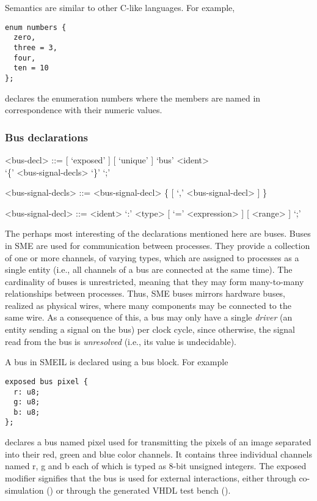 Semantics are similar to other C-like languages. For example,
\begin{lstlisting}[language=smeil]
enum numbers {
  zero,
  three = 3,
  four,
  ten = 10
};
\end{lstlisting}
declares the enumeration {\ttfamily numbers} where the members are named in
correspondence with their numeric values.


\subsubsection{Bus declarations}

\begin{grammar}
<bus-decl> ::= [ `exposed' ] [ `unique' ] `bus' <ident> \\ `\{' <bus-signal-decls> `\}'  `;'

<bus-signal-decls> ::= <bus-signal-decl> \{ [ `,' <bus-signal-decl> ] \}

<bus-signal-decl> ::= <ident> `:' <type> [ `=' <expression> ] [ <range> ] `;'
\end{grammar}

The perhaps most interesting of the declarations mentioned here are buses. Buses
in SME are used for communication between processes. They provide a collection
of one or more channels, of varying types, which are assigned to processes as a
single entity (i.e., all channels of a bus are connected at the same time). The
cardinality of buses is unrestricted, meaning that they may form many-to-many
relationships between processes. Thus, SME buses mirrors hardware buses,
realized as physical wires, where many components may be connected to the same
wire. As a consequence of this, a bus may only have a single {\itshape driver} (an
entity sending a signal on the bus) per clock cycle, since otherwise, the signal
read from the bus is {\itshape unresolved} (i.e., its value is undecidable).

A bus in SMEIL is declared using a {\ttfamily bus} block. For example
\begin{lstlisting}[language=smeil]
exposed bus pixel {
  r: u8;
  g: u8;
  b: u8;
};
\end{lstlisting}
declares a bus named {\ttfamily pixel} used for transmitting the pixels of an
image separated into their red, green and blue color channels. It contains three
individual channels named {\ttfamily r}, {\ttfamily g} and {\ttfamily b} each of
which is typed as 8-bit unsigned integers. The {\ttfamily exposed} modifier
signifies that the bus is used for external interactions, either through
co-simulation () or through the generated VHDL test bench
().

